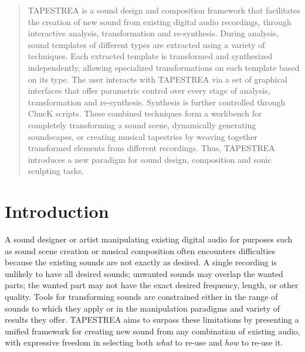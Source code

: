 \documentclass{sig-alt-release2}
\begin{document}
\maketitle
\begin{abstract}

TAPESTREA is a sound design and composition framework that facilitates the creation 
of new sound from existing digital audio recordings, through interactive analysis, 
transformation and re-synthesis. During analysis, sound templates of different types are 
extracted using a variety of techniques. Each extracted template is transformed and 
synthesized independently, allowing specialized transformations on each template based 
on its type. The user interacts with TAPESTREA 
via a set of graphical interfaces that offer parametric control over every stage of analysis, 
transformation and re-synthesis. Synthesis is further controlled through ChucK scripts. 
These combined techniques form a workbench for completely transforming a sound 
scene, dynamically generating soundscapes, or creating musical tapestries by weaving 
together transformed elements from different recordings. Thus, TAPESTREA introduces 
a new paradigm for sound design, composition and sonic sculpting tasks.
\end{abstract}




\section{Introduction}

A sound designer or artist manipulating existing digital audio for purposes such as sound scene creation or musical composition often encounters difficulties because the existing sounds are not exactly as desired. A single recording is unlikely to have all desired sounds; unwanted sounds may overlap the wanted parts; the wanted part may not have the exact desired frequency, length, or other quality. Tools for transforming sounds are constrained either in the range of sounds to which they apply or in the manipulation paradigms and variety of results they offer. TAPESTREA aims to surpass these limitations by presenting a unified framework for creating new sound from any combination of existing audio, with expressive freedom in selecting both \textit{what} to re-use and \textit{how} to re-use it. 
\end{document}
